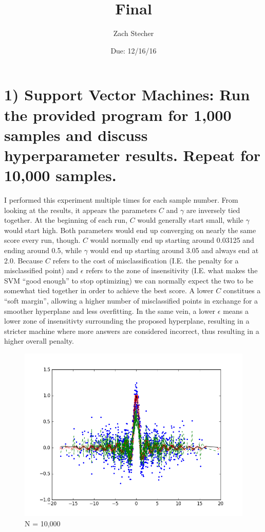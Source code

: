 \documentclass[12pt]{article}
\title{Final}
\author{Zach Stecher}
\date{Due: 12/16/16}
\begin{document}
\maketitle

\section*{1) Support Vector Machines: Run the provided program for 1,000 samples and discuss hyperparameter results. Repeat for 10,000 samples.}

I performed this experiment multiple times for each sample number. From looking at the results, it appears the parameters $\textit{C}$ and $\gamma$ are inversely tied together. At the beginning of each run, $\textit{C}$ would generally start small, while $\gamma$ would start high. Both parameters would end up converging on nearly the same score every run, though. $\textit{C}$ would normally end up starting around 0.03125 and ending around 0.5, while $\gamma$ would end up starting around 3.05 and always end at 2.0. Because $\textit{C}$ refers to the cost of misclassification (I.E. the penalty for a misclassified point) and $\epsilon$ refers to the zone of insensitivity (I.E. what makes the SVM ``good enough'' to stop optimizing) we can normally expect the two to be somewhat tied together in order to achieve the best score. A lower $\textit{C}$ constitues a ``soft margin'', allowing a higher number of misclassified points in exchange for a smoother hyperplane and less overfitting. In the same vein, a lower $\epsilon$ means a lower zone of insensitivty surrounding the proposed hyperplane, resulting in a stricter machine where more answers are considered incorrect, thus resulting in a higher overall penalty.

\begin{figure}[H]
\raggedright
\includegraphics[width=1\textwidth]{SVMsincN10000.png}
\caption{N = 10,000}
\end{figure}
\end{document}
